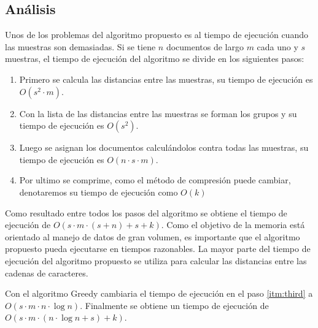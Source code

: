 \newpage
\subsection{Análisis}


Unos de los problemas del algoritmo propuesto es al tiempo de ejecución cuando las muestras son demasiadas. Si se tiene $n$ documentos de largo $m$ cada uno y $s$ muestras, el tiempo de ejecución del algoritmo se divide en los siguientes pasos: 

\begin{enumerate}
  \item \label{itm:first} Primero se calcula las distancias entre las muestras, su tiempo de ejecución es $ O(s^{2} \cdot m)$.
  \item \label{itm:second} Con la lista de las distancias entre las muestras se forman los grupos y su tiempo de ejecución es $O(s^2)$.
  \item \label{itm:third} Luego se asignan los documentos calculándolos contra todas las muestras, su tiempo de ejecución es $O(n \cdot s \cdot m)$.
  \item \label{itm:fourth} Por ultimo se comprime, como el método de compresión puede cambiar, denotaremos su tiempo de ejecución como $O(k)$
\end{enumerate}

Como resultado entre todos los pasos del algoritmo se obtiene el tiempo de ejecución de $O(s \cdot m \cdot (s + n)+ s +k)$. Como el objetivo de la memoria está orientado al manejo de datos de gran volumen, es importante que el algoritmo propuesto pueda ejecutarse en tiempos razonables. La mayor parte del tiempo de ejecución del algoritmo propuesto se utiliza para calcular las distancias entre las cadenas de caracteres.


Con el algoritmo Greedy cambiaria el tiempo de ejecución en el paso \ref{itm:third} a $O(s \cdot m \cdot n \cdot \log n)$. Finalmente se obtiene un tiempo de ejecución de $O(s \cdot m \cdot ( n \cdot \log n + s) +k)$. 

